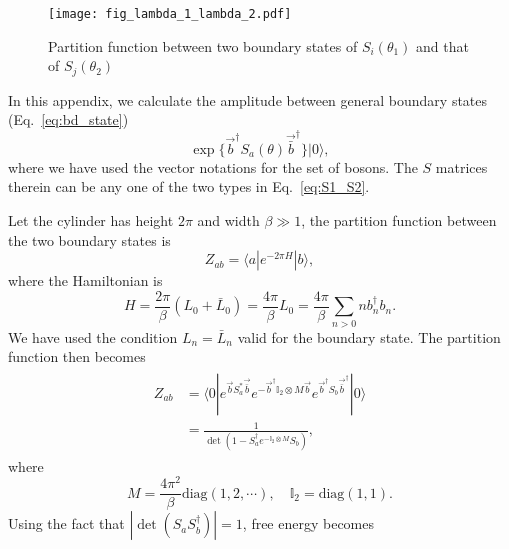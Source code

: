 
\begin{figure}[h]
\centering
\texttt{[image: fig\_lambda\_1\_lambda\_2.pdf]}
\caption{Partition function between two boundary states of $S_i( \theta_1)$ and that of $S_j( \theta_2 )$}
\label{fig:fig_lambda_1_lambda_2}
\end{figure}

In this appendix, we calculate the amplitude between general boundary states (\cf  Eq.~\eqref{eq:bd_state})
\begin{equation}
\exp\Big\{  \vec{b}^{\dagger} S_a( \theta )   \vec{\bar{b}}^{\dagger}\Big\}  |0  \rangle ,
\end{equation}
where we have used the vector notations for the set of bosons. The $S$ matrices therein can be any one of the two types in Eq.~\eqref{eq:S1_S2}. 

Let the cylinder has height $2\pi$ and width $\beta \gg 1 $, the partition function between the two boundary states is
\begin{equation}
Z_{ab} =  \langle a | e^{ - 2\pi H } |b \rangle ,
\end{equation}
where the Hamiltonian is
\begin{equation}
H = \frac{2\pi}{\beta} (L_0 + \bar{L}_0) =  \frac{4\pi}{\beta}  L_0 = \frac{4\pi}{\beta}\sum_{n > 0 }  n b_n^{\dagger} b_n. 
\end{equation}
We have used the condition $L_n = \bar{L}_n$ valid for the boundary state. The partition function then becomes
\begin{eqnarray}\begin{aligned}
Z_{ab} &= \langle 0 | e^{ \vec{b} S_a^* \vec{\bar{b}} } e^{ - \vec{b}^{\dagger} \mathbb{I}_2 \otimes M  \vec{b} } e^{  \vec{b}^{\dagger} S_b  \vec{\bar{b}}^{\dagger} }  |0  \rangle  \\
&= \frac{1}{\det ( 1 - S^{\dagger} _a  e^{- \mathbb{I}_2 \otimes M} S_b) } ,
\end{aligned}\end{eqnarray}
where
\begin{equation}
M =  \frac{4\pi^2}{\beta} \text{diag}( 1, 2, \cdots ), \quad  \mathbb{I}_2 = \text{diag}( 1, 1) .
\end{equation}
Using the fact that $|\det( S_a S_b^{\dagger})|  = 1$, free energy becomes
